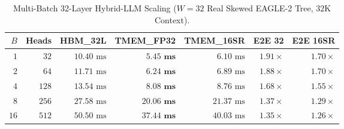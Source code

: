 \documentclass[conference,10pt]{IEEEtran}
\begin{document}
\begin{table}[t]
\centering
\caption{Full 32-Layer Hybrid-LLM ($24$ Gated-DeltaNet + $8$ Full-Attn @ $32\text{K}$, $B{=}4$) Speculative Tree Verification ($W{=}1..64$, $\alpha{=}0.85$).}
\label{tab:hybrid_w}
\end{table}

\begin{table}[t]
\centering
\caption{Multi-Batch 32-Layer Hybrid-LLM Scaling ($W{=}32$ Real Skewed EAGLE-2 Tree, $32\text{K}$ Context).}
\label{tab:hybrid_b}
\begin{tabular}{rrrrrrr}
\toprule
\textbf{$B$} & \textbf{Heads} & \textbf{HBM\_32L} & \textbf{TMEM\_FP32} & \textbf{TMEM\_16SR} & \textbf{E2E 32} & \textbf{E2E 16SR} \\
\midrule
$1$ & $32$ & $10.40\text{ ms}$ & $\mathbf{5.45\text{ ms}}$ & $6.10\text{ ms}$ & $\mathbf{1.91\times}$ & $1.70\times$ \\
$2$ & $64$ & $11.71\text{ ms}$ & $\mathbf{6.24\text{ ms}}$ & $6.89\text{ ms}$ & $\mathbf{1.88\times}$ & $1.70\times$ \\
$4$ & $128$ & $13.54\text{ ms}$ & $\mathbf{8.08\text{ ms}}$ & $8.76\text{ ms}$ & $\mathbf{1.68\times}$ & $1.55\times$ \\
$8$ & $256$ & $27.58\text{ ms}$ & $\mathbf{20.06\text{ ms}}$ & $21.37\text{ ms}$ & $\mathbf{1.37\times}$ & $1.29\times$ \\
$16$ & $512$ & $50.50\text{ ms}$ & $\mathbf{37.44\text{ ms}}$ & $40.03\text{ ms}$ & $\mathbf{1.35\times}$ & $1.26\times$ \\
\bottomrule
\end{tabular}
\end{table}
\end{document}
